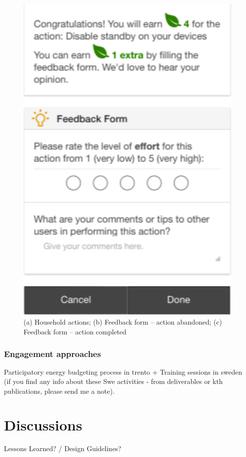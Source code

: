 \begin{figure}
\begin{center}
\begin{minipage}[t!]{0.33\linewidth}
        \end{minipage}
        \begin{minipage}[t!]{0.31\linewidth}
        	       \includegraphics[width=1\linewidth]{img/action_completed.pdf}
                \end{minipage}
      \end{center}
      \caption{(a) Household actions; (b) Feedback form -- action abandoned; (c) Feedback form -- action completed}\label{fig:form}
\end{figure}



\subsubsection{Engagement approaches} %
\begin{svgraybox}
[note by GP] Participatory energy budgeting process in trento + Training sessions 
in sweden (if you find any info about these Swe activities - from deliverables or kth publications, 
please send me a note).
\end{svgraybox}



\section{Discussions} %

\begin{svgraybox}
Lessons Learned?  / Design Guidelines? 
\end{svgraybox}